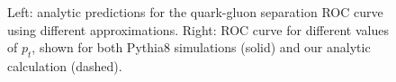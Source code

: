 \begin{figure}
  \centering
  \hfill%
  \caption{Left: analytic predictions for the quark-gluon separation
    ROC curve using different approximations. Right: ROC curve for
    different values of $p_t$, shown for both Pythia8 simulations
    (solid) and our analytic calculation (dashed).}\label{fig:grm-ang-basicprops}
\end{figure}  


